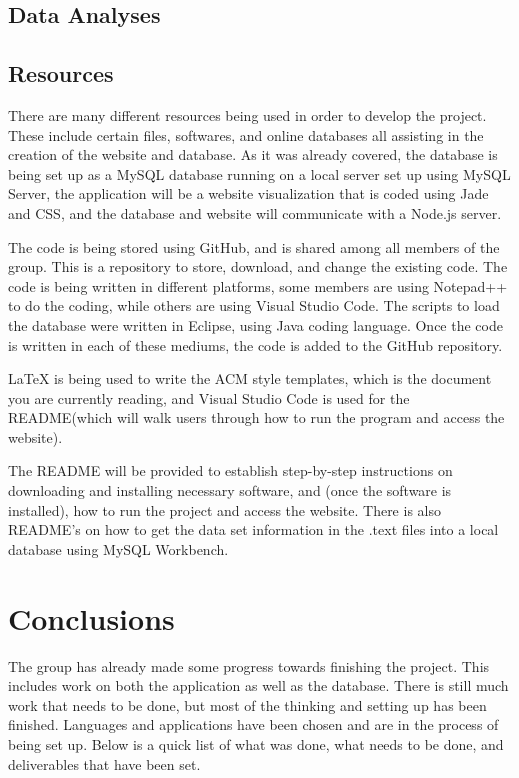\documentclass{Group6_Phase2}
\begin{document}
\subsection{Data Analyses}

\subsection{Resources}
There are many different resources being used in order to develop the project. These include certain files, softwares, and online databases all assisting in the creation of the website and database. As it was already covered, the database is being set up as a MySQL database running on a local server set up using MySQL Server, the application will be a website visualization that is coded using Jade and CSS, and the database and website will communicate with a Node.js server. 

The code is being stored using GitHub, and is shared among all members of the group. This is a repository to store, download, and change the existing code. The code is being written in different platforms, some members are using Notepad++ to do the coding, while others are using Visual Studio Code. The scripts to load the database were written in Eclipse, using Java coding language. Once the code is written in each of these mediums, the code is added to the GitHub repository. 

LaTeX is being used to write the ACM style templates, which is the document you are currently reading, and Visual Studio Code is used for the README(which will walk users through how to run the program and access the website).

The README will be provided to establish step-by-step instructions on downloading and installing necessary software, and (once the software is installed), how to run the project and access the website. There is also README's on how to get the data set information in the .text files into a local database using MySQL Workbench. 


\section{Conclusions}
The group has already made some progress towards finishing the project. This includes work on both the application as well as the database. There is still much work that needs to be done, but most of the thinking and setting up has been finished. Languages and applications have been chosen and are in the process of being set up. Below is a quick list of what was done, what needs to be done, and deliverables that have been set.  
\end{document}
